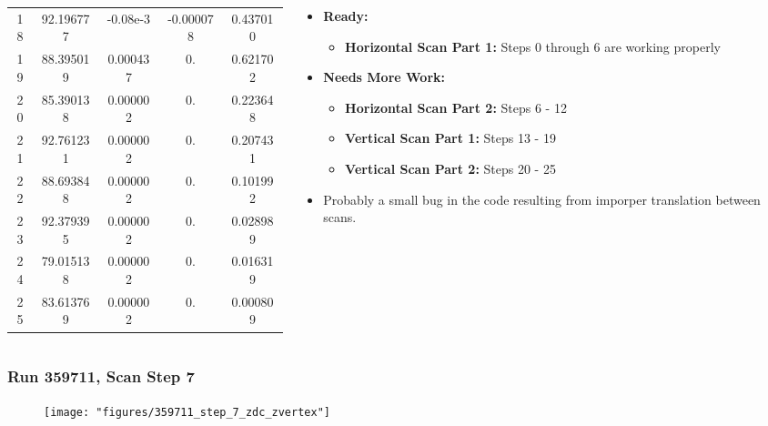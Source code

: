\begin{frame}
\begin{columns}[onlytextwidth]
\begin{column}{0.5\textwidth}
{\begin{tabular}{c c c c c}
      18&92.196777&-0.08e-3&-0.000078&0.437010\\
      19&88.395019&0.000437&0.&0.621702\\
      20&85.390138&0.000002&0.&0.223648\\
      21&92.761231&0.000002&0.&0.207431\\
      22&88.693848&0.000002&0.&0.101992\\
      23&92.379395&0.000002&0.&0.028989\\
      24&79.015138&0.000002&0.&0.016319\\
      25&83.613769&0.000002&0.&0.000809\\
      \bottomrule
    \end{tabular}
  }
\end{column}
\begin{column}{0.5\textwidth}
	\begin{itemize}
		\item\textbf{Ready:}
			\begin{itemize}
				\item \textbf{Horizontal Scan Part 1:} Steps 0 through 6 are working properly
			\end{itemize}
		\item\textbf{Needs More Work:}
				\begin{itemize}
					\item \textbf{Horizontal Scan Part 2:} Steps 6 - 12
					\item \textbf{Vertical Scan Part 1: } Steps 13 - 19
					\item \textbf{Vertical Scan Part 2: } Steps 20 - 25
				\end{itemize}
		\item Probably a small bug in the code resulting from imporper translation
			between scans.
		\end{itemize}
\end{column}
\end{columns}
\end{frame}

\begin{frame}
\frametitle{Run 359711, Scan Step 7}
\begin{figure}
\begin{center}
\texttt{[image: "figures/359711\_step\_7\_zdc\_zvertex"]}
\caption{ }
\label{fig:359711_step_7_zdc_zvertex}
\end{center}\end{figure}
\end{frame}

